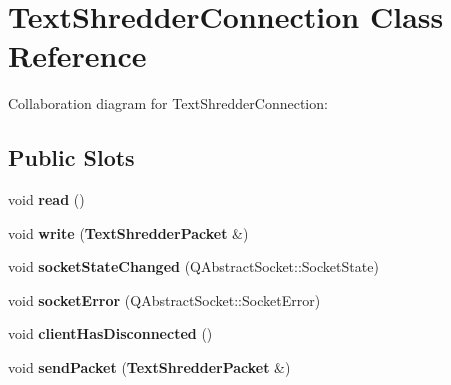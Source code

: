 \section{TextShredderConnection Class Reference}
\label{class_text_shredder_connection}


Collaboration diagram for TextShredderConnection:
\subsection*{Public Slots}
\begin{DoxyCompactItemize}
\item 
void {\bfseries read} ()\label{class_text_shredder_connection_af026ddf63817564ba3b494bb3fe63768}

\item 
void {\bfseries write} ({\bf TextShredderPacket} \&)\label{class_text_shredder_connection_acf1e4260675c90dde5c2bd9a16907863}

\item 
void {\bfseries socketStateChanged} (QAbstractSocket::SocketState)\label{class_text_shredder_connection_afe3e646db80ba80b8f64704138e5e2ff}

\item 
void {\bfseries socketError} (QAbstractSocket::SocketError)\label{class_text_shredder_connection_abe32ce5a39cfe11298d6455b077b7d24}

\item 
void {\bfseries clientHasDisconnected} ()\label{class_text_shredder_connection_a77c6bc3f39a96a68a5c1d55914f138a5}

\item 
void {\bfseries sendPacket} ({\bf TextShredderPacket} \&)\label{class_text_shredder_connection_a11e920ba0fc122613d84e70fb018a6a1}

\end{DoxyCompactItemize}
